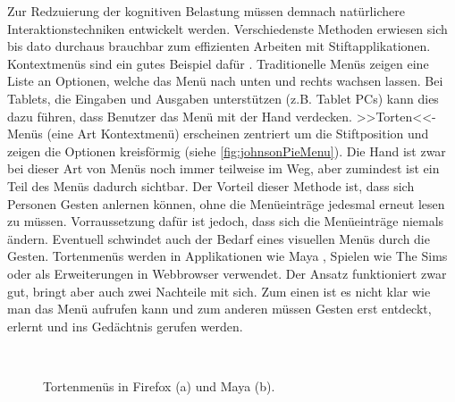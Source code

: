 \medskip Zur Redzuierung der kognitiven Belastung müssen demnach natürlichere Interaktionstechniken entwickelt werden. Verschiedenste Methoden erwiesen sich bis dato durchaus brauchbar zum effizienten Arbeiten mit Stiftapplikationen. Kontextmenüs sind ein gutes Beispiel dafür \citep{Kurtenbach:1991}. Traditionelle Menüs zeigen eine Liste an Optionen, welche das Menü nach unten und rechts wachsen lassen. Bei Tablets, die Eingaben und Ausgaben unterstützen (z.B. Tablet PCs) kann dies dazu führen, dass Benutzer das Menü mit der Hand verdecken. >>Torten<<-Menüs (eine Art Kontextmenü) erscheinen zentriert um die Stiftposition und zeigen die Optionen kreisförmig (siehe \autoref{fig:johnsonPieMenu}). Die Hand ist zwar bei dieser Art von Menüs noch immer teilweise im Weg, aber zumindest ist ein Teil des Menüs dadurch sichtbar. Der Vorteil dieser Methode ist, dass sich Personen Gesten anlernen können, ohne die Menüeinträge jedesmal erneut lesen zu müssen. Vorraussetzung dafür ist jedoch, dass sich die Menüeinträge niemals ändern. Eventuell schwindet auch der Bedarf eines visuellen Menüs durch die Gesten. Tortenmenüs werden in Applikationen wie Maya \citep{Maya:2010}, Spielen wie The Sims \citep{EA:2010} oder als Erweiterungen in Webbrowser verwendet. Der Ansatz funktioniert zwar gut, bringt aber auch zwei Nachteile mit sich. Zum einen ist es nicht klar wie man das Menü aufrufen kann und zum anderen müssen Gesten erst entdeckt, erlernt und ins Gedächtnis gerufen werden.

\begin{figure}
        \myfloatalign
         \quad
         \\
        \caption[Tortenmenüs]{Tortenmenüs in Firefox (a) und Maya (b).}\label{fig:johnsonPieMenu}
\end{figure}

